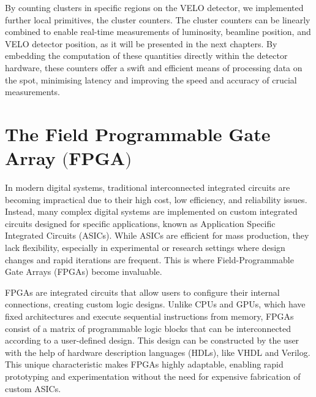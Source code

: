 By counting clusters in specific regions on the VELO detector, we implemented further local primitives, the cluster counters. The cluster counters can be linearly combined to enable real-time measurements of luminosity, beamline position, and VELO detector position, as it will be presented in the next chapters. By embedding the computation of these quantities directly within the detector hardware, these counters offer a swift and efficient means of processing data on the spot, minimising latency and improving the speed and accuracy of crucial measurements. 

\section[The Field Programmable Gate Array]{The Field Programmable Gate Array $\bigl($FPGA$\bigr)$}

In modern digital systems, traditional interconnected integrated circuits are becoming impractical due to their high cost, low efficiency, and reliability issues. Instead, many complex digital systems are implemented on custom integrated circuits designed for specific applications, known as Application Specific Integrated Circuits (ASICs). While ASICs are efficient for mass production, they lack flexibility, especially in experimental or research settings where design changes and rapid iterations are frequent. This is where Field-Programmable Gate Arrays (FPGAs) become invaluable.

FPGAs are integrated circuits that allow users to configure their internal connections, creating custom logic designs. Unlike CPUs and GPUs, which have fixed architectures and execute sequential instructions from memory, FPGAs consist of a matrix of programmable logic blocks that can be interconnected according to a user-defined design. This design can be constructed by the user with the help of hardware description languages (HDLs), like VHDL and Verilog. This unique characteristic makes FPGAs highly adaptable, enabling rapid prototyping and experimentation without the need for expensive fabrication of custom ASICs.


